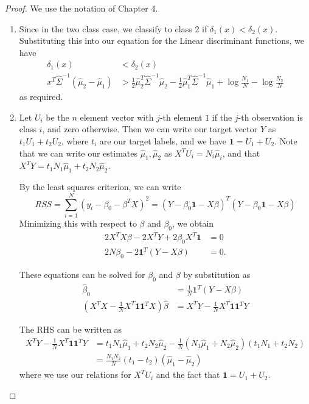 \begin{proof}
    We use the notation of Chapter 4.
    \begin{enumerate}
        \item Since in the two class case, we classify to class 2 if $\delta_1(x) < \delta_2(x)$.  Substituting this into our equation for the Linear discriminant functions, we have \begin{align*}
                \delta_1(x) &< \delta_2(x) \\ 
                x^T \hat \Sigma^{-1} (\hat \mu_2 - \hat \mu_1) &> \frac{1}{2} \hat \mu_2^T \hat \Sigma^{-1} \hat \mu_2 - \frac{1}{2} \hat \mu_1^T \hat \Sigma^{-1} \hat \mu_1 + \log \frac{N_1}{N} - \log \frac{N_2}{N}
            \end{align*}
            as required.
        \item Let $U_i$ be the $n$ element vector with $j$-th element $1$ if the $j$-th observation is class $i$, and zero otherwise.  Then we can write our target vector $Y$ as $t_1 U_1 + t_2 U_2$, where $t_i$ are our target labels, and we have $\mathbf{1} = U_1 + U_2$.  Note that we can write our estimates $\hat \mu_1, \hat \mu_2$ as $X^T U_i = N_i \hat \mu_i$, and that $X^T Y = t_1 N_1 \hat \mu_1 + t_2 N_2 \hat \mu_2$.   
               
            By the least squares criterion, we can write \[
                RSS = \sum_{i=1}^{N} (y_i - \beta_0 - \beta^T X)^2 = (Y - \beta_0 \mathbf{1} - X \beta)^T (Y - \beta_0 \mathbf{1} - X\beta)
                \] Minimizing this with respect to $\beta$ and $\beta_0$, we obtain \begin{align*} 2 X^T X \beta - 2X^T Y + 2 \beta_0 X^T \mathbf{1} &= 0 \\ 2N \beta_0 - 2 \mathbf{1}^T (Y - X \beta) &= 0. \end{align*}  

                These equations can be solved for $\beta_0$ and $\beta$ by substitution as \begin{align*} \hat \beta_0 &= \frac{1}{N} \mathbf{1}^T (Y - X\beta) \\
                    \left(X^T X - \frac{1}{N}X^T \mathbf{1} \mathbf{1}^T X\right) \hat \beta &= X^T Y - \frac{1}{N} X^T \mathbf{1} \mathbf{1}^T Y
                \end{align*}

                The RHS can be written as \begin{align*}
                    X^T Y - \frac{1}{N} X^T \mathbf{1} \mathbf{1}^T Y &= t_1 N_1 \hat \mu_1 + t_2 N_2 \hat \mu_2 - \frac{1}{N} (N_1 \hat \mu_1 + N_2 \hat \mu_2)(t_1 N_1 + t_2 N_2) \\
                    &= \frac{N_1 N_2}{N} (t_1 - t_2) (\hat \mu_1 - \hat \mu_2)
                \end{align*} where we use our relations for $X^T U_i$ and the fact that $\mathbf{1} = U_1 + U_2$.  


\end{enumerate}
\end{proof}
